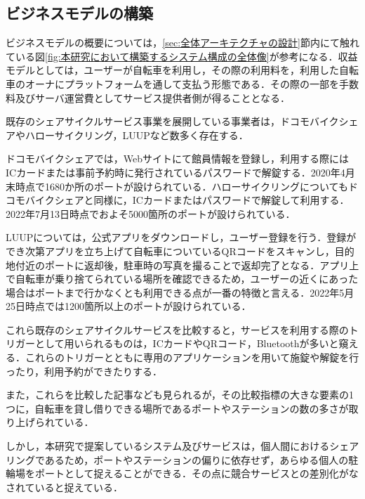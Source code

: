   \subsection{ビジネスモデルの構築}
    \label{sec:ビジネスモデルの構築}
      \par ビジネスモデルの概要については，\ref{sec:全体アーキテクチャの設計}節内にて触れている図\ref{fig:本研究において構築するシステム構成の全体像}が参考になる．収益モデルとしては，ユーザーが自転車を利用し，その際の利用料を，利用した自転車のオーナにプラットフォームを通して支払う形態である．その際の一部を手数料及びサーバ運営費としてサービス提供者側が得ることとなる．
      \par 既存のシェアサイクルサービス事業を展開している事業者は，ドコモバイクシェアやハローサイクリング，LUUPなど数多く存在する．
      \par ドコモバイクシェアでは，Webサイトにて館員情報を登録し，利用する際にはICカードまたは事前予約時に発行されているパスワードで解錠する．2020年4月末時点で1680か所のポートが設けられている．ハローサイクリングについてもドコモバイクシェアと同様に，ICカードまたはパスワードで解錠して利用する．2022年7月13日時点でおよそ5000箇所のポートが設けられている．
      \par LUUPについては，公式アプリをダウンロードし，ユーザー登録を行う．登録ができ次第アプリを立ち上げて自転車についているQRコードをスキャンし，目的地付近のポートに返却後，駐車時の写真を撮ることで返却完了となる．アプリ上で自転車が乗り捨てられている場所を確認できるため，ユーザーの近くにあった場合はポートまで行かなくとも利用できる点が一番の特徴と言える．2022年5月25日時点では1200箇所以上のポートが設けられている．
      \par これら既存のシェアサイクルサービスを比較すると，サービスを利用する際のトリガーとして用いられるものは，ICカードやQRコード，Bluetoothが多いと窺える．これらのトリガーとともに専用のアプリケーションを用いて施錠や解錠を行ったり，利用予約ができたりする．
      \par また，これらを比較した記事なども見られるが，その比較指標の大きな要素の1つに，自転車を貸し借りできる場所であるポートやステーションの数の多さが取り上げられている．
      \par しかし，本研究で提案しているシステム及びサービスは，個人間におけるシェアリングであるため，ポートやステーションの偏りに依存せず，あらゆる個人の駐輪場をポートとして捉えることができる．その点に競合サービスとの差別化がなされていると捉えている．
